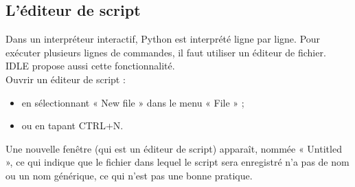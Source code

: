\subsection{L'éditeur de script}
Dans un interpréteur interactif, Python est interpr\' et\' e ligne par ligne. Pour ex\' ecuter plusieurs lignes de commandes, il faut utiliser un \' editeur de fichier. IDLE propose aussi cette fonctionnalité.\\
Ouvrir un éditeur de script :
\begin{itemize}
 \item en s\' electionnant « New file » dans le menu « File » ;
 \item ou en tapant CTRL+N.
\end{itemize}

Une nouvelle fenêtre (qui est un éditeur de script) apparaît, nommée « Untitled », ce qui indique que le fichier dans lequel le script sera enregistré n'a pas de nom ou un nom générique, ce qui n'est pas une bonne pratique.

